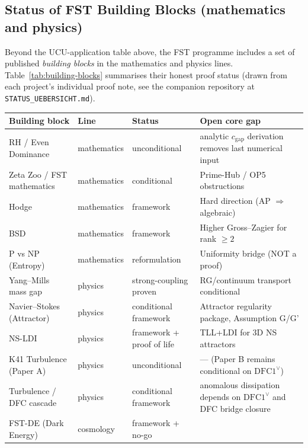 \documentclass[11pt,a4paper]{article}
\theoremstyle{remark}
\begin{document}
\subsection{Status of FST Building Blocks (mathematics and physics)}
\label{subsec:building-blocks}

Beyond the UCU-application table above, the FST programme includes a
set of published \emph{building blocks} in the mathematics and physics
lines. Table~\ref{tab:building-blocks} summarises their honest proof
status (drawn from each project's individual proof note, see the
companion repository at \texttt{STATUS\_UEBERSICHT.md}).

\begin{table}[h]
\centering
\renewcommand{\arraystretch}{1.18}
\scriptsize
\begingroup
\setlength{\tabcolsep}{4pt}
\begin{tabularx}{\textwidth}{p{2.6cm}p{1.8cm}p{2.4cm}Y}
\toprule
\textbf{Building block} & \textbf{Line} & \textbf{Status} &
\textbf{Open core gap} \\
\midrule
RH / Even Dominance & mathematics & unconditional & analytic
$c_{\text{gap}}$ derivation removes last numerical input \\
Zeta Zoo / FST mathematics & mathematics & conditional   & Prime-Hub /
OP5 obstructions \\
Hodge                    & mathematics & framework     & Hard direction
(AP $\Rightarrow$ algebraic) \\
BSD                      & mathematics & framework     & Higher
Gross--Zagier for rank $\ge 2$ \\
P vs NP (Entropy)        & mathematics & reformulation & Uniformity
bridge (NOT a proof) \\
\midrule
Yang--Mills mass gap     & physics     & strong-coupling proven &
RG/continuum transport conditional \\
Navier--Stokes (Attractor) & physics   & conditional framework &
Attractor regularity package, Assumption G/G' \\
NS-LDI                   & physics     & framework + proof of life &
TLL+LDI for 3D NS attractors \\
K41 Turbulence (Paper A) & physics     & unconditional & --- (Paper B
remains conditional on $\mathrm{DFC1}^{\vee}$) \\
Turbulence / DFC cascade & physics     & conditional framework &
anomalous dissipation depends on $\mathrm{DFC1}^{\vee}$ and DFC bridge
closure \\
\midrule
FST-DE (Dark Energy)     & cosmology   & framework + no-go &

\end{tabularx}
\end{table}
\end{document}
